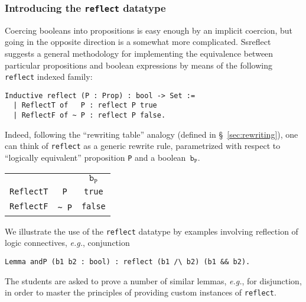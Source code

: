 \documentclass[blockstyle,preprint,nocopyrightspace]{sigplanconf}
\newcommand{\code}[1]{\lstinline{#1}}
\newcommand{\eg}{\emph{e.g.}\xspace}
\begin{document}
\subsubsection{Introducing the \code{reflect} datatype}
\label{sec:reflect}

Coercing booleans into propositions is easy enough by an implicit
coercion, but going in the opposite direction is a somewhat more
complicated. Ssreflect suggests a general methodology for implementing
the equivalence between particular propositions and boolean
expressions by means of the following \code{reflect} indexed family:
%
\begin{lstlisting}
Inductive reflect (P : Prop) : bool -> Set :=
  | ReflectT of   P : reflect P true
  | ReflectF of ~ P : reflect P false.
\end{lstlisting}
%
Indeed, following the ``rewriting table'' analogy (defined in
\S~\ref{sec:rewriting}), one can think of \code{reflect} as a generic
rewrite rule, parametrized with respect to ``logically equivalent''
proposition \code{P} and a boolean~$\mathtt{b_P}$.

\vspace{5pt}

\begin{center}
\hspace{-20pt}
  \begin{tabular}{r|r|c|}
    \cline{3-3}
    \multicolumn{2}{c|}{} & $\mathtt{b_P}$
    \\
    \cline{2-3}
    \multicolumn{1}{r}{\code{ReflectT}} & \multicolumn{1}{|c||}{\code{P}} & \code{true} 
    \\
    \cline{2-3}
\multicolumn{1}{r}{\code{ReflectF}} & \multicolumn{1}{|c||}{{\small\texttt\textasciitilde}~\code{P}}  & \code{false} 
\\\cline{2-3}
  \end{tabular}
\end{center}
%
\vspace{5pt}
%
We illustrate the use of the \code{reflect} datatype by examples
involving reflection of logic connectives, \eg, conjunction
%
\begin{lstlisting}
Lemma andP (b1 b2 : bool) : reflect (b1 /\ b2) (b1 && b2).
\end{lstlisting}
%
The students are asked to prove a number of similar lemmas, \eg, for
disjunction, in order to master the principles of providing custom
instances of \code{reflect}.
\end{document}
